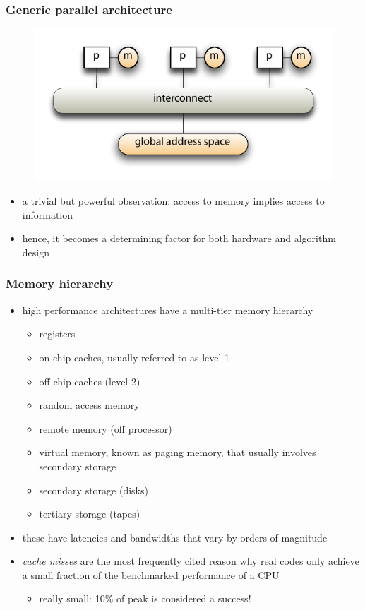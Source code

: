 \begin{frame}[fragile]
%
  \frametitle{Generic parallel architecture}
%
  \begin{figure}
    \centering
    \includegraphics[width=.75\linewidth]{figures/generic-parallel-architecture.pdf}
    \label{fig:generic-parallel-architecture}
  \end{figure}

  \begin{itemize}
%
  \item a trivial but powerful observation: access to memory implies access to information
  \item hence, it becomes a determining factor for both hardware and algorithm design
%
  \end{itemize}
%
\end{frame}

\begin{frame}[fragile]
%
  \frametitle{Memory hierarchy}
%
  \begin{itemize}
  \item high performance architectures have a multi-tier memory hierarchy
%
    \begin{itemize}
    \item registers
    \item on-chip caches, usually referred to as level 1
    \item off-chip caches (level 2)
    \item random access memory
    \item remote memory (off processor)
    \item virtual memory, known as paging memory, that usually involves secondary storage
    \item secondary storage (disks)
    \item tertiary storage (tapes)
    \end{itemize}
%
  \item these have latencies and bandwidths that vary by orders of magnitude
  \item {\em cache misses} are the most frequently cited reason why real codes only achieve a
    small fraction of the benchmarked performance of a CPU
    \begin{itemize}
    \item really small: 10\% of peak is considered a success!
    \end{itemize}
%
  \end{itemize}
%
\end{frame}

